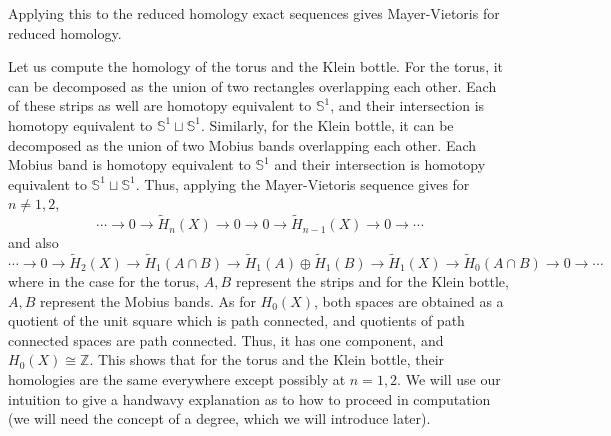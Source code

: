 \documentclass[12pt,reqno]{amsart}
\numberwithin{theorem}{section}
\theoremstyle{definition}
\theoremstyle{remark}
\numberwithin{equation}{section}
\newcommand{\Z}{\mathbb Z}
\renewcommand{\S}{\mathbb S}
\theoremstyle{definition}
\begin{document}
\begin{remark}
    Applying this to the reduced homology exact sequences gives Mayer-Vietoris for reduced homology.
\end{remark}
\begin{example}
    Let us compute the homology of the torus and the Klein bottle. For the torus, it can be decomposed as the union of two rectangles overlapping each other. Each of these strips as well are homotopy equivalent to $\S^1$, and their intersection is homotopy equivalent to $\S^1 \sqcup \S^1$. Similarly, for the Klein bottle, it can be decomposed as the union of two Mobius bands overlapping each other. Each Mobius band is homotopy equivalent to $\S^1$ and their intersection is homotopy equivalent to $\S^1 \sqcup \S^1$. Thus, applying the Mayer-Vietoris sequence gives for $n \neq 1,2$,
    $$\cdots \rightarrow 0\rightarrow \tilde H_n(X) \rightarrow 0 \rightarrow 0 \rightarrow \tilde H_{n-1}(X) \rightarrow 0 \rightarrow \cdots$$
    and also
    $$\cdots \rightarrow 0 \rightarrow \tilde H_2(X) \rightarrow \tilde H_1(A\cap B)\rightarrow \tilde H_1(A)\oplus \tilde H_1(B) \rightarrow \tilde H_1(X) \rightarrow \tilde H_0(A\cap B) \rightarrow 0\rightarrow \cdots$$
    where in the case for the torus, $A,B$ represent the strips and for the Klein bottle, $A,B$ represent the Mobius bands. As for $H_0(X)$, both spaces are obtained as a quotient of the unit square which is path connected, and quotients of path connected spaces are path connected. Thus, it has one component, and $H_0(X) \cong \Z$. This shows that for the torus and the Klein bottle, their homologies are the same everywhere except possibly at $n=1,2$. We will use our intuition to give a handwavy explanation as to how to proceed in computation (we will need the concept of a degree, which we will introduce later). 
    

\end{example}
\end{document}
